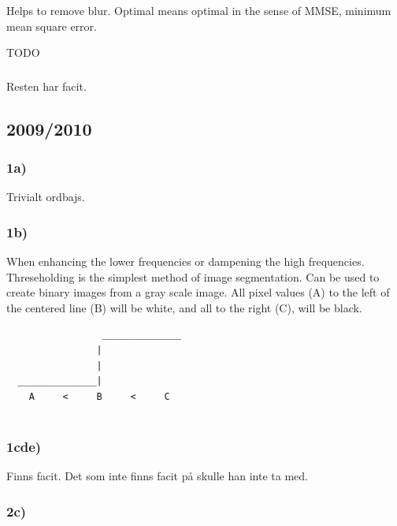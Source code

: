 \documentclass[12pt]{article}
\begin{document}
        Helps to remove blur. Optimal means optimal in the sense of MMSE, minimum mean square error.
        
        TODO

    \subsubsection*{}
    
        Resten har facit. 
        
\subsection{2009/2010}

    \subsubsection*{1a)}
    
        Trivialt ordbajs.
    
    \subsubsection*{1b)}
    
        When enhancing the lower frequencies or dampening the high frequencies. Threseholding is the simplest
        method of image segmentation. Can be used to create binary images from a gray scale image. 
        All pixel values (A) to the left of the centered line (B) will be white, and all to the right (C), will be black.
        \begin{verbatim}
                 ______________
                |
                |
  ______________|
    A     <     B     <     C
            
        \end{verbatim}

    \subsubsection*{1cde)}
    
        Finns facit. Det som inte finns facit på skulle han inte ta med.
        
    \subsubsection*{2c)}
    
\end{document}
